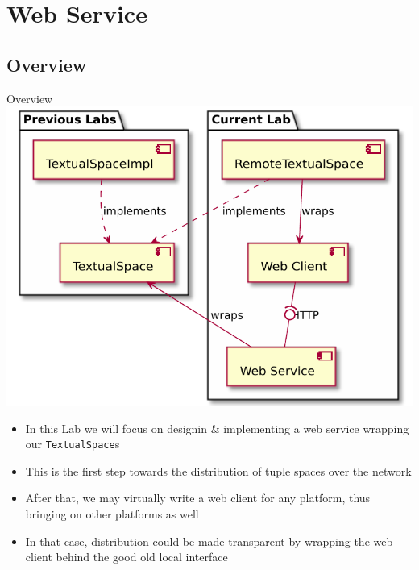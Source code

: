 \documentclass[presentation]{beamer}\mode<presentation>{\usetheme{AMSCesenaPurpleAndGold}}
\begin{document}
\section{\linda{} Web Service}

\subsection{Overview}

\begin{frame}[allowframebreaks]{Overview}
    \centering
    \includegraphics[height=.8\textheight]{img/whole-picture.pdf}

    \bigskip

    \begin{itemize}
        \item In this Lab we will focus on designin \& implementing a \alert{web service} wrapping our \texttt{TextualSpace}s
        
        \bigskip
        
        \item This is the first step towards the \alert{distribution} of \linda{} tuple spaces over the network
        
        \bigskip
        
        \item After that, we may virtually write a \alert{web client} for any platform, thus bringing \linda{} on other platforms as well
        
        \bigskip
        
        \item In that case, distribution could be made \alert{transparent} by wrapping the web client behind the good old local interface
    \end{itemize}
\end{frame}
\end{document}
